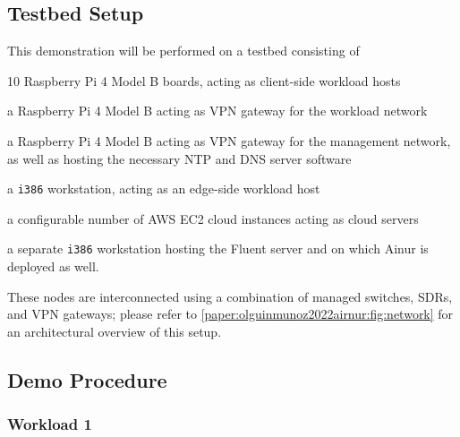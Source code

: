 \subsection{Testbed Setup}

This demonstration will be performed on a testbed consisting of
\begin{enumerate*}[itemjoin={{; }}, itemjoin*={{; and finally }}]
    \item \num{10} Raspberry Pi 4 Model B boards, acting as client-side workload hosts
    \item a Raspberry Pi 4 Model B acting as \gls{VPN} gateway for the workload network
    \item a Raspberry Pi 4 Model B acting as \gls{VPN} gateway for the management network, as well as hosting the necessary \gls{NTP} and \gls{DNS} server software
    \item a \texttt{i386} workstation, acting as an edge-side workload host
    \item a configurable number of  \gls{AWS} \gls{EC2} cloud instances acting as cloud servers
    \item a separate \texttt{i386} workstation hosting the Fluent server and on which Ainur is deployed as well.
\end{enumerate*}
These nodes are interconnected using a combination of managed switches, \glspl{SDR}, and \gls{VPN} gateways; please refer to \cref{paper:olguinmunoz2022airnur:fig:network} for an architectural overview of this setup.


\subsection{Demo Procedure}

\subsubsection{Workload 1}

